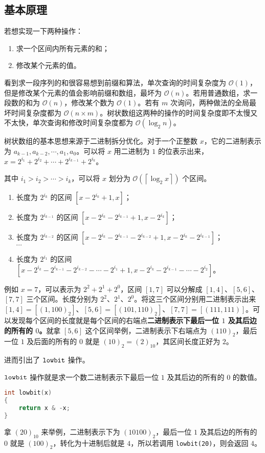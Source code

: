 
\subsection{基本原理}

若想实现一下两种操作：
\begin{enumerate}
\item 求一个区间内所有元素的和；
\item 修改某个元素的值。
\end{enumerate}

看到求一段序列的和很容易想到前缀和算法，单次查询的时间复杂度为 $\mathcal{O}(1)$，但是修改某个元素的值会影响前缀和数组，最坏为 $\mathcal{O}(n)$。若用普通数组，求一段数的和为 $\mathcal{O}(n)$，修改某个数为 $\mathcal{O}(1)$。若有 $m$ 次询问，两种做法的全局最坏时间复杂度都为 $\mathcal{O}(n \times m)$。树状数组这两种的操作的时间复杂度即不太慢又不太快，单次查询和修改时间复杂度都为 $\mathcal{O}(\log_2 n)$。

树状数组的基本思想来源于二进制拆分优化。对于一个正整数 $x$，它的二进制表示为 $a_{k - 1}, a_{k - 2}, \cdots , a_1, a_0$。可以将 $x$ 用二进制为 $1$ 的位表示出来，$x = 2^{i_1} + 2^{i_2} + \cdots + 2^{i_{k - 1}} + 2^{i_k}$。

其中 $i_1 > i_2 > \cdots > i_k$，可以将 $x$ 划分为 $\mathcal{O}(\left\lceil \log_2 x \right\rceil)$ 个区间。

\begin{enumerate}
\item 长度为 $2^{i_k}$ 的区间 $[x - 2^{i_k} + 1 , x]$；
\item 长度为 $2^{i_{k - 1}}$ 的区间 $[x - 2^{i_k} - 2^{i_{k - 1}} + 1, x - 2^{i_k}]$；
\item 长度为 $2^{i_{k - 2}}$ 的区间 $[x - 2^{i_k} - 2^{i_{k - 1}} -2^{i_{k - 2}} + 1, x - 2^{i_k} - 2^{i_{k - 1}}]$； \\
$\cdots$
\item 长度为 $2^{i_{1}}$ 的区间 $[x - 2^{i_k} - 2^{i_{k - 1}} -2^{i_{k - 2}} - \cdots -2^{i_1} + 1, x - 2^{i_k} - 2^{i_{k - 1}} - \cdots - 2^{i_2}]$。
\end{enumerate}

例如 $x = 7$，可以表示为 $2^2+2^1+2^0$，区间 $[1, 7]$ 可以分解成 $[1, 4]$、$[5, 6]$、$[7, 7]$ 三个区间。长度分别为 $2^2$、$2^1$、$2^0$。将这三个区间分别用二进制表示出来 $[1, 4] = [(1, 100)_2]$、$[5, 6] = [(101, 110)_2]$、$[7, 7] = [(111, 111)]$。可以发现每个区间的长度就是每个区间的右端点\textbf{二进制表示下最后一位 $1$ 及其后边的所有的 $0$。}就拿 $[5, 6]$ 这个区间举例，二进制表示下右端点为 $(110)_2$，最后一位 $1$ 及后面的所有的 $0$ 就是 $(10)_2 = (2)_{10}$，其区间长度正好为 $2$。

进而引出了 $\tt lowbit$ 操作。

$\tt lowbit$ 操作就是求一个数二进制表示下最后一位 $1$ 及其后边的所有的 $0$ 的数值。

\begin{lstlisting}[language=cpp]
int lowbit(x)
{
    return x & -x;
}
\end{lstlisting}

拿 $(20)_{10}$ 来举例，二进制表示下为 $(10100)_2$，最后一位 $1$ 及其后边的所有的 $0$ 就是 $(100)_2$，转化为十进制后就是 $4$，所以若调用 \verb|lowbit(20)|，则会返回 $4$。